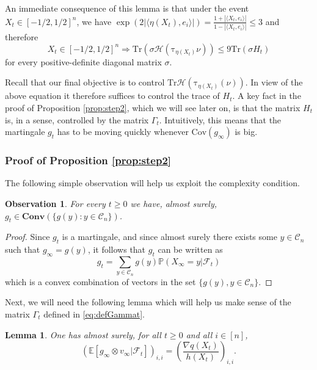 \documentclass[12pt]{article}
\def \tilt{ \mathrm{\tau} }
\def \EE {\mathbb E}
\def \PP {\mathbb P}
\def \FF {\mathcal{F}}
\def \tr {\mathrm{Tr}}
\def \DC {\mathcal{C}_n}
\def \HH {\mathcal{H}}
\newtheorem{lemma}[theorem]{Lemma}
\newtheorem{observation}[theorem]{Observation}
\theoremstyle{definition}
\theoremstyle{remark}
\begin{document}
An immediate consequence of this lemma is that under the event $X_t \in [-1/2,1/2]^n$, we have $\exp (2 |\langle \eta(X_t), e_i \rangle |) = \frac{1+ | \langle X_t, e_i \rangle |}{1 - | \langle X_t, e_i \rangle |} \leq 3$ and therefore
\begin{equation}\label{eq:HtHt}
X_t \in [-1/2,1/2]^n \Rightarrow \tr (\sigma \HH(\tilt_{\eta(X_t)} \nu ) ) \leq 9 \tr \left (\sigma H_t \right )
\end{equation}
for every positive-definite diagonal matrix $\sigma$.

Recall that our final objective is to control $\tr \HH(\tilt_{\eta(X_t)} (\nu))$. In view of the above equation it therefore suffices to control the trace of $H_t$. A key fact in the proof of Proposition \ref{prop:step2}, which we will see later on, is that the matrix $H_t$ is, in a sense, controlled by the matrix $\Gamma_t$. Intuitively, this means that the martingale $g_t$ has to be moving quickly whenever $\mathrm{Cov}(g_\infty)$ is big.

\subsubsection{Proof of Proposition \ref{prop:step2}}

The following simple observation will help us exploit the complexity condition.
\begin{observation} \label{obs:convhull}
	For every $t \geq 0$ we have, almost surely, $g_t \in \mathbf{Conv}(\{g(y): y \in \DC \} )$.
\end{observation}
\begin{proof}
	Since $g_t$ is a martingale, and since almost surely there exists some $y \in \DC$ such that $g_\infty = g(y)$, it follows that $g_t$ can be written as 
	$$
	g_t = \sum_{y \in \DC} g(y) \PP(X_\infty = y | \FF_t)
	$$
	which is a convex combination of vectors in the set $\{g(y), y \in \DC\}$.
\end{proof}

Next, we will need the following lemma which will help us make sense of the matrix $\Gamma_t$ defined in \eqref{eq:defGammat}. 
\begin{lemma} \label{lem:diagequal}
	One has almost surely, for all $t \geq 0$ and all $i \in [n]$,
	$$
	\left (\EE[g_\infty \otimes v_\infty | \FF_t ] \right )_{i,i} = \left (\frac{\nabla q (X_t) }{h(X_t)} \right )_{i,i}.
	$$
\end{lemma}
\end{document}
